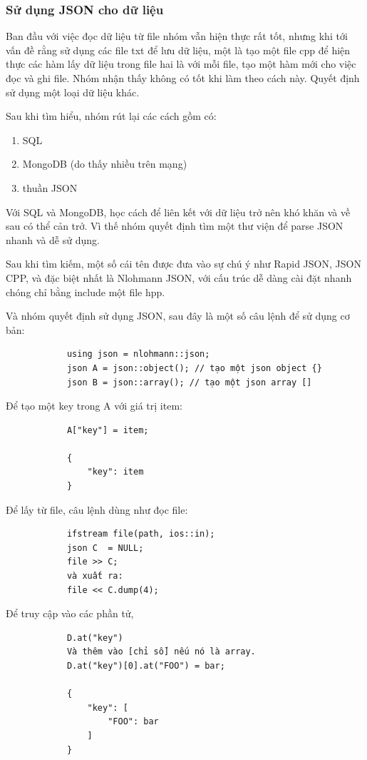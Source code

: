 \documentclass[12pt,a4paper]{report}
\begin{document}
			\subsubsection{Sử dụng JSON cho dữ liệu}
			Ban đầu với việc đọc dữ liệu từ file nhóm vẫn hiện thực rất tốt, nhưng khi tới vấn đề rằng sử dụng các file txt để lưu dữ liệu, một là tạo một file cpp để hiện thực các hàm lấy dữ liệu trong file hai là với mỗi file, tạo một hàm mới cho việc đọc và ghi file. Nhóm nhận thấy không có tốt khi làm theo cách này. Quyết định sử dụng một loại dữ liệu khác. \par
			Sau khi tìm hiểu, nhóm rút lại các cách gồm có:
			\begin{enumerate}
				\item SQL
				\item MongoDB (do thấy nhiều trên mạng)
				\item thuần JSON
			\end{enumerate}
			Với SQL và MongoDB, học cách để liên kết với dữ liệu trở nên khó khăn và về sau có thể cản trở. Vì thế nhóm quyết định tìm một thư viện để parse JSON nhanh và dễ sử dụng.\par
			Sau khi tìm kiếm, một số cái tên được đưa vào sự chú ý như Rapid JSON, JSON CPP, và đặc biệt nhất là Nlohmann JSON, với cấu trúc dễ dàng cài đặt nhanh chóng chỉ bằng include một file hpp.\par
			Và nhóm quyết định sử dụng JSON, sau đây là một số câu lệnh để sử dụng cơ bản:
			\begin{verbatim}
			using json = nlohmann::json;
			json A = json::object(); // tạo một json object {}
			json B = json::array(); // tạo một json array []
			\end{verbatim}
			Để tạo một key trong A với giá trị item:
			\begin{verbatim}
			A["key"] = item;

			{
				"key": item
			}
			\end{verbatim}
			Để lấy từ file, câu lệnh dùng như đọc file:
			\begin{verbatim}
			ifstream file(path, ios::in);
			json C  = NULL;
			file >> C;
			và xuất ra:
			file << C.dump(4);
			\end{verbatim}
			Để truy cập vào các phần tử,
			\begin{verbatim}
			D.at("key")
			Và thêm vào [chỉ số] nếu nó là array.
			D.at("key")[0].at("FOO") = bar;

			{
				"key": [
					"FOO": bar
				]
			}
			\end{verbatim}
\end{document}
